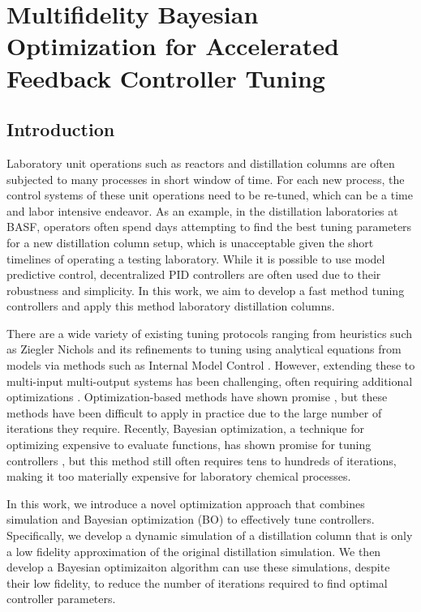\chapter{Multifidelity Bayesian Optimization for Accelerated Feedback Controller Tuning}\label{ch:mfbo} 

\section{Introduction}
\label{sec:intro}
Laboratory unit operations such as reactors and distillation columns  are often subjected to many processes in short window of time. For each new process, the control systems of these unit operations need to be re-tuned, which can be a time and labor intensive endeavor. As an example, in the distillation laboratories at BASF, operators often spend days attempting to find the best tuning parameters for a new distillation column setup, which is unacceptable given the short timelines of operating a testing laboratory. While it is possible to use model predictive control, decentralized PID controllers are often used due to their robustness and simplicity. In this work, we aim to develop a fast method tuning controllers and apply this method laboratory distillation columns.

There are a wide variety of existing tuning protocols ranging from heuristics such as Ziegler Nichols \citep{Ziegler1942} and its refinements \citep{Hang1991} to tuning using analytical equations from models via methods such as  Internal Model Control \citep{Copeland2010}. However, extending these to multi-input multi-output systems has been challenging, often requiring additional optimizations \citep{Nandong2013, Nandong2015}. Optimization-based methods have shown promise \citep{Pajares2019, Sumana2010, Rajapandiyan2012, Behroozsarand2012}, but these methods have been difficult to apply in practice due to the large number of iterations they require. Recently, Bayesian optimization, a technique for optimizing expensive to evaluate functions, has shown promise for tuning controllers \citep{NeumannBrosig2020, Fiducioso2019, Khosravi2020, Konig2020, Fujimoto2022, Brunzema2022, Khosravi2022}, but this method still often requires tens to hundreds of iterations, making it too materially expensive for laboratory chemical processes. 

In this work, we introduce a novel optimization approach that combines simulation and Bayesian optimization (BO) to effectively tune controllers. Specifically, we develop a dynamic simulation of a distillation column that is only a low fidelity approximation of the original distillation simulation. We then develop a Bayesian optimizaiton algorithm can use these simulations, despite their low fidelity, to reduce the number of iterations required to find optimal controller parameters. 

